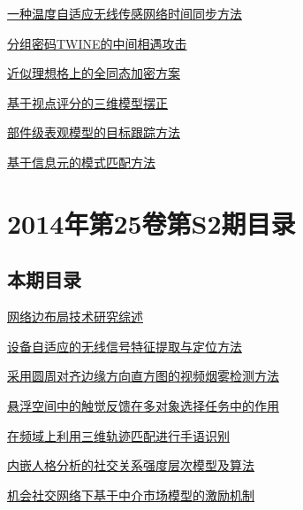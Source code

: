 \documentclass[a4paper]{article}
\begin{document}
\href{http://www.jos.org.cn/ch/reader/download_pdf.aspx?file_no=4792&year_id=2015&quarter_id=10&falg=1}{一种温度自适应无线传感网络时间同步方法}

\href{http://www.jos.org.cn/ch/reader/download_pdf.aspx?file_no=4805&year_id=2015&quarter_id=10&falg=1}{分组密码TWINE的中间相遇攻击}

\href{http://www.jos.org.cn/ch/reader/download_pdf.aspx?file_no=4808&year_id=2015&quarter_id=10&falg=1}{近似理想格上的全同态加密方案}

\href{http://www.jos.org.cn/ch/reader/download_pdf.aspx?file_no=4742&year_id=2015&quarter_id=10&falg=1}{基于视点评分的三维模型摆正}

\href{http://www.jos.org.cn/ch/reader/download_pdf.aspx?file_no=4737&year_id=2015&quarter_id=10&falg=1}{部件级表观模型的目标跟踪方法}

\href{http://www.jos.org.cn/ch/reader/download_pdf.aspx?file_no=4798&year_id=2015&quarter_id=10&falg=1}{基于信息元的模式匹配方法}


\section{\textbf{2014年第25卷第S2期目录}}
\subsection{本期目录}
\href{http://www.jos.org.cn/ch/reader/download_pdf.aspx?file_no=14017&year_id=2014&quarter_id=S2&falg=1}{网络边布局技术研究综述}

\href{http://www.jos.org.cn/ch/reader/download_pdf.aspx?file_no=14018&year_id=2014&quarter_id=S2&falg=1}{设备自适应的无线信号特征提取与定位方法}

\href{http://www.jos.org.cn/ch/reader/download_pdf.aspx?file_no=14019&year_id=2014&quarter_id=S2&falg=1}{采用圆周对齐边缘方向直方图的视频烟雾检测方法}

\href{http://www.jos.org.cn/ch/reader/download_pdf.aspx?file_no=14020&year_id=2014&quarter_id=S2&falg=1}{悬浮空间中的触觉反馈在多对象选择任务中的作用}

\href{http://www.jos.org.cn/ch/reader/download_pdf.aspx?file_no=14021&year_id=2014&quarter_id=S2&falg=1}{在频域上利用三维轨迹匹配进行手语识别}

\href{http://www.jos.org.cn/ch/reader/download_pdf.aspx?file_no=14022&year_id=2014&quarter_id=S2&falg=1}{内嵌人格分析的社交关系强度层次模型及算法}

\href{http://www.jos.org.cn/ch/reader/download_pdf.aspx?file_no=14023&year_id=2014&quarter_id=S2&falg=1}{机会社交网络下基于中介市场模型的激励机制}
\end{document}
